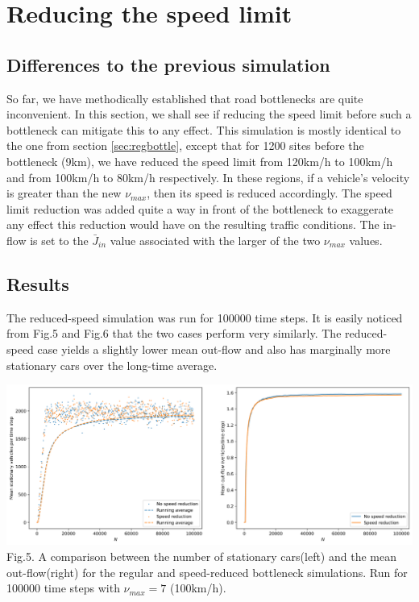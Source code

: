 \documentclass[11pt]{article}
\begin{document}
	\section{Reducing the speed limit}\label{sec:limit}
	
	\subsection{Differences to the previous simulation}\label{subsec:new}
	
	So far, we have methodically established that road bottlenecks are quite inconvenient. In this section, we shall see if reducing the speed limit before such a bottleneck can mitigate this to any effect. This simulation is mostly identical to the one from section \ref{sec:regbottle}, except that for 1200 sites before the bottleneck (9km), we have reduced the speed limit from 120km/h to 100km/h and from 100km/h to 80km/h respectively. In these regions, if a vehicle's velocity is greater than the new $\nu_{max}$, then its speed is reduced accordingly. The speed limit reduction was added quite a way in front of the bottleneck to exaggerate any effect this reduction would have on the resulting traffic conditions. The in-flow is set to the $\bar{J}_{in}$ value associated with the larger of the two $\nu_{max}$ values.\\
	
	
	\subsection{Results}\label{subsec:results}
	
	The reduced-speed simulation was run for 100000 time steps. It is easily noticed from Fig.5 and Fig.6 that the two cases perform very similarly. The reduced-speed case yields a slightly lower mean out-flow and also has marginally more stationary cars over the long-time average. \\
	
	\begin{center}
		\includegraphics[scale=0.46]{Figures/Speedlimit_bottleneck_vmax7.png}\\
		Fig.5.	
		A comparison between the number of stationary cars(left) and the mean out-flow(right) for the regular and speed-reduced bottleneck simulations. Run for 100000 time steps with $\nu_{max}=7$ (100km/h). \\
	\end{center}
\end{document}
